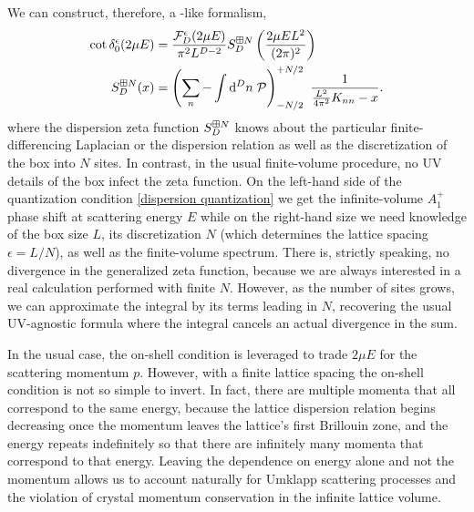 We can construct, therefore, a \Luscher-like formalism,
\begin{align}
    \label{eq:dispersion quantization}
    \cot \delta_0^{\epsilon}( 2\mu E ) &= \frac{\mathcal{F}_D^\epsilon(2\mu E)}{\pi^2 L^{D-2}} S^{\boxplus N}_{D}\left(\frac{2\mu E L^2}{(2\pi)^2}\right)
    \\
    \label{eq:dispersion S}
    S^{\boxplus N}_{D}( x )
    &=
    \left(\sum_n - \int \mathrm{d}^D n\; \mathcal{P} \right)_{-N/2}^{+N/2}\  \frac{1}{ \frac{L^2}{4\pi^2}K_{nn} - x}.
\end{align}
where the dispersion zeta function $S^{\boxplus N}_{D}$ knows about the particular finite-differencing Laplacian or the dispersion relation as well as the discretization of the box into $N$ sites.
In contrast, in the usual finite-volume procedure, no UV details of the box infect the zeta function.
On the left-hand side of the quantization condition \eqref{dispersion quantization} we get the infinite-volume $A_1^+$ phase shift at scattering energy $E$ while on the right-hand size we need knowledge of the box size $L$, its discretization $N$ (which determines the lattice spacing $\epsilon=L/N$), as well as the finite-volume spectrum.
There is, strictly speaking, no divergence in the generalized zeta function, because we are always interested in a real calculation performed with finite $N$.
However, as the number of sites grows, we can approximate the integral by its terms leading in $N$, recovering the usual UV-agnostic formula where the integral cancels an actual divergence in the sum.

In the usual case, the on-shell condition is leveraged to trade $2\mu E$ for the scattering momentum $p$.  However, with a finite lattice spacing the on-shell condition is not so simple to invert.
In fact, there are multiple momenta that all correspond to the same energy, because the lattice dispersion relation begins decreasing once the momentum leaves the lattice's first Brillouin zone, and the energy repeats indefinitely so that there are infinitely many momenta that correspond to that energy.
Leaving the dependence on energy alone and not the momentum allows us to account naturally for Umklapp scattering processes and the violation of crystal momentum conservation in the infinite lattice volume.

